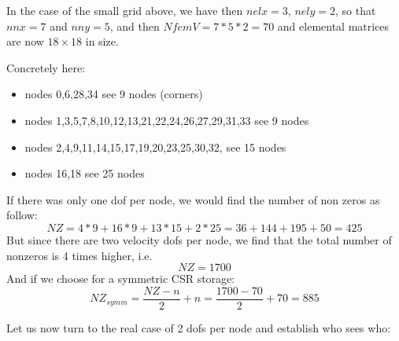 \begin{center}

\end{center}

In the case of the small grid above, we have then 
$nelx=3$, $nely=2$, so that $nnx=7$ and $nny=5$, and then
$NfemV=7*5*2=70$ and elemental matrices are now $18\times18$ in size.


\begin{center}

\end{center}


Concretely here:
\begin{itemize}
\item nodes {\color{teal} 0,6,28,34} see 9 nodes (corners)
\item nodes 1,3,5,7,8,10,12,13,21,22,24,26,27,29,31,33 see 9 nodes
\item nodes 2,4,9,11,14,15,17,19,20,23,25,30,32, see 15 nodes
\item nodes 16,18 see 25 nodes
\end{itemize}

If there was only one dof per node, we would find 
the number of non zeros as follow:
\[
NZ=4*9 + 16*9 + 13*15 + 2*25 = 36+144 + 195 + 50 = 425
\]
But since there are two velocity dofs per node, we find that 
the total number of nonzeros is 4 times higher, i.e.
\[
NZ=1700
\] 
And if we choose for a symmetric CSR storage:
\[
NZ_{symm} = \frac{NZ-n}{2}+n = \frac{1700-70}{2} + 70 = 885 
\]

Let us now turn to the real case of 2 dofs per node and establish 
who sees who:

